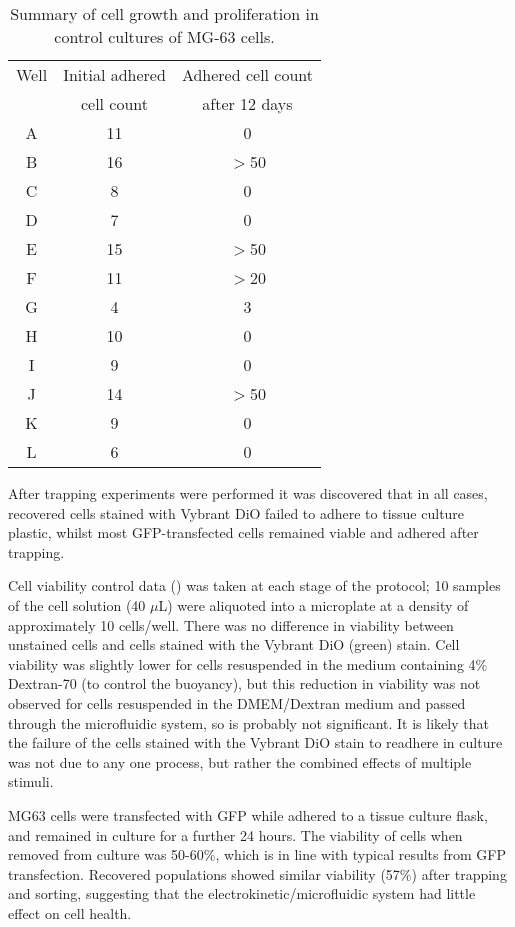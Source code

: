 \begin{table}[b]
	\centering
		\begin{tabular} {c c c}
		\hline
		Well &	Initial adhered	& Adhered cell count  \\
					& cell count			& after 12 days \\
		\hline
		A &	11	& 0 \\
		B	&	16	&	$>$50 \\
		C	&	8	&	0 \\
		D	&	7	&	0 \\
		E	&	15	&	$>$50 \\
		F	&	11	&	$>$20 \\
		G	&	4	&	3 \\
		H	&	10	&	0 \\
		I	&	9	&	0 \\
		J	&	14	&	$>$50 \\
		K	&	9	&	0 \\
		L	&	6	&	0 \\
		\hline			
		\end{tabular}
	\caption{Summary of cell growth and proliferation in control cultures of MG-63 cells.}
	\label{tab:MG63_controls_proliferation_cell_density}
\end{table}

After trapping experiments were performed it was discovered that in all cases, recovered cells stained with Vybrant DiO failed to adhere to tissue culture plastic, whilst most GFP-transfected cells remained viable and adhered after trapping.
	
Cell viability control data () was taken at each stage of the protocol; 10 samples of the cell solution (40 $\mu$L) were aliquoted into a microplate at a density of approximately 10 cells/well. There was no difference in viability between unstained cells and cells stained with the Vybrant DiO (green) stain. Cell viability was slightly lower for cells resuspended in the medium containing 4$\%$ Dextran-70 (to control the buoyancy), but this reduction in viability was not observed for cells resuspended in the DMEM/Dextran medium and passed through the microfluidic system, so is probably not significant. It is likely that the failure of the cells stained with the Vybrant DiO stain to readhere in culture was not due to any one process, but rather the combined effects of multiple stimuli. 

MG63 cells were transfected with GFP while adhered to a tissue culture flask, and remained in culture for a further 24 hours. The viability of cells when removed from culture was 50-60\%, which is in line with typical results from GFP transfection. Recovered populations showed similar viability (57\%) after trapping and sorting, suggesting that the electrokinetic/microfluidic system had little effect on cell health.

